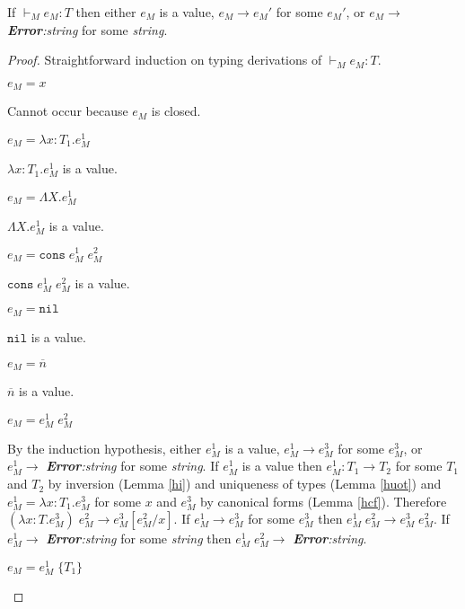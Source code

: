 \begin{mps}
\label{mps}
If $\vdash_{M}e_{M}:T$ then either $e_{M}$ is a value, $e_{M}\rightarrow e_{M}'$ for some $e_{M}'$, or $e_{M}\rightarrow$ \emph{\textbf{Error}:\;string} for some \emph{string}.



\begin{proof}
Straightforward induction on typing derivations of $\vdash_{M}e_{M}:T$.
\begin{mps-case-1}
$e_{M}=x$

Cannot occur because $e_{M}$ is closed.
\end{mps-case-1}
\begin{mps-case-2}
$e_{M}=\lambda x:T_{1}.e_{M}^{1}$

$\lambda x:T_{1}.e_{M}^{1}$ is a value.
\end{mps-case-2}
\begin{mps-case-3}
$e_{M}=\Lambda X.e_{M}^{1}$

$\Lambda X.e_{M}^{1}$ is a value.
\end{mps-case-3}
\begin{mps-case-4}
$e_{M}=\mathtt{cons}\;e_{M}^{1}\;e_{M}^{2}$

$\mathtt{cons}\;e_{M}^{1}\;e_{M}^{2}$ is a value.
\end{mps-case-4}
\begin{mps-case-5}
$e_{M}=\mathtt{nil}$

$\mathtt{nil}$ is a value.
\end{mps-case-5}
\begin{mps-case-6}
$e_{M}=\overline{n}$

$\overline{n}$ is a value.
\end{mps-case-6}
\begin{mps-case-7}
$e_{M}=e_{M}^{1}\;e_{M}^{2}$

By the induction hypothesis, either $e_{M}^{1}$ is a value, $e_{M}^{1}\rightarrow e_{M}^{3}$ for some $e_{M}^{3}$, or $e_{M}^{1}\rightarrow$ \emph{\textbf{Error}:\;string} for some \emph{string}.  If $e_{M}^{1}$ is a value then $e_{M}^{1}:T_{1}\rightarrow T_{2}$ for some $T_{1}$ and $T_{2}$ by inversion (Lemma \ref{hi}) and uniqueness of types (Lemma \ref{huot}) and $e_{M}^{1}=\lambda x:T_{1}.e_{M}^{3}$ for some $x$ and $e_{M}^{3}$ by canonical forms (Lemma \ref{hcf}).  Therefore $(\lambda x:T.e_{M}^{3})\;e_{M}^{2}\rightarrow e_{M}^{3}[e_{M}^{2}/x]$.  If $e_{M}^{1}\rightarrow e_{M}^{3}$ for some $e_{M}^{3}$ then $e_{M}^{1}\;e_{M}^{2}\rightarrow e_{M}^{3}\;e_{M}^{2}$.  If $e_{M}^{1}\rightarrow$ \emph{\textbf{Error}:\;string} for some \emph{string} then $e_{M}^{1}\;e_{M}^{2}\rightarrow$ \emph{\textbf{Error}:\;string}.
\end{mps-case-7}
\begin{mps-case-8}
$e_{M}=e_{M}^{1}\;\lbrace T_{1}\rbrace$


\end{mps-case-8}
\end{proof}
\end{mps}
